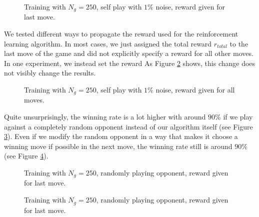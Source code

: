 \documentclass[10pt,twocolumn,letterpaper]{article}
\begin{document}
\begin{figure}[t]
    \begin{center}
		\noindent
		\makebox[3.25in]{
	   		
		}
	\end{center}
    \caption{Training with $N_g=250$, self play with $1\%$ noise, reward given for last move.}
	\label{fig:last_move_self_001}
\end{figure}
We tested different ways to propagate the reward used for the reinforcement learning algorithm.
In most cases, we just assigned the total reward $r_{total}$ to the last move of the game and did not explicitly specify a reward for all other moves.
In one experiment, we instead set the reward
As Figure \ref{fig:all_moves_self_001} shows, this change does not visibly change the results.
\begin{figure}[t]
    \begin{center}
		\noindent
		\makebox[3.25in]{
	   		
		}
	\end{center}
    \caption{Training with $N_g=250$, self play with $1\%$ noise, reward given for all moves.}
	\label{fig:all_moves_self_001}
\end{figure}

Quite unsurprisingly, the winning rate is a lot higher with around $90 \%$ if we play against a completely random opponent instead of our algorithm itself (see Figure \ref{fig:last_move_random}).
Even if we modify the random opponent in a way that makes it choose a winning move if possible in the next move, the winning rate still is around $90 \%$ (see Figure \ref{fig:last_move_random_with_winning_move}).
\begin{figure}[t]
    \begin{center}
		\noindent
		\makebox[3.25in]{
	   		
		}
	\end{center}
    \caption{Training with $N_g=250$, randomly playing opponent, reward given for last move.}
	\label{fig:last_move_random}
\end{figure}
\begin{figure}[t]
    \begin{center}
		\noindent
		\makebox[3.25in]{
	   		
		}
	\end{center}
    \caption{Training with $N_g=250$, randomly playing opponent, reward given for last move.}
	\label{fig:last_move_random_with_winning_move}
\end{figure}
\end{document}
